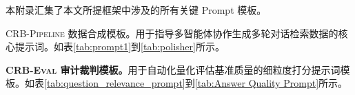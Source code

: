 本附录汇集了本文所提框架中涉及的所有关键 Prompt 模板。

\textsc{CRB-Pipeline} 数据合成模板。用于指导多智能体协作生成多轮对话检索数据的核心提示词。如表\ref{tab:prompt1}到\ref{tab:polisher}所示。

\textbf{\textsc{CRB-Eval} 审计裁判模板。}用于自动化量化评估基准质量的细粒度打分提示词模板。如表\ref{tab:question_relevance_prompt}到\ref{tab:Answer Quality Prompt}所示。
\begin{table}[!htbp]
\small


    \label{tab:prompt1}
\end{table}
\begin{table}
\small

    \label{tab:prompt2}
    
\end{table}


\begin{table}[!htbp]
\small

    \label{tab:polisher}
\end{table}

\begin{table}[!htbp]
\small

    \label{tab:question_relevance_prompt}
\end{table}

\begin{table}[!htbp]
\small

    \label{tab:Annotation Correctness Prompt}
\end{table}



\begin{table}[!htbp]
\small

    \label{tab:RESPONSE_FAITHFUL}
\end{table}



\begin{table}[!htbp]
\small
{}

    \label{tab:Answer Quality Prompt}
\end{table}



